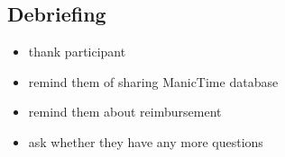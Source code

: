 \subsection{Debriefing}
\begin{itemize}
\item thank participant
\item remind them of sharing ManicTime database
\item remind them about reimbursement
\item ask whether they have any more questions
\end{itemize}
